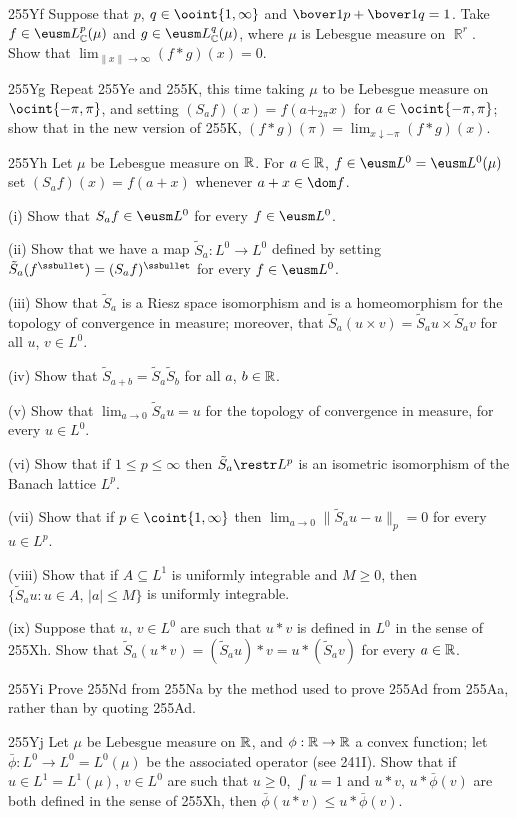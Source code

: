 {\spheader 255Yf Suppose that $p$, $q\in\ooint{1,\infty}$ and
$\bover1p+\bover1q=1$.   Take $f\in\eusm L^p_{\Bbb C}(\mu)$ and
$g\in\eusm L^q_{\Bbb C}(\mu)$, where $\mu$ is Lebesgue measure on
$\BbbR^r$.   Show that $\lim_{\|x\|\to\infty}(f*g)(x)=0$.

\spheader 255Yg Repeat 255Ye and 255K, this time taking $\mu$ to
be Lebesgue measure on $\ocint{-\pi,\pi}$, and setting
$(S_af)(x)=f(a+_{2\pi}x)$ for $a\in\ocint{-\pi,\pi}$;  show that in the
new version of 255K,
$(f*g)(\pi)=\lim_{x\downarrow -\pi}(f*g)(x)$.

\spheader 255Yh Let $\mu$ be Lebesgue measure on $\Bbb R$.   For
$a\in\Bbb R$, $f\in\eusm L^0=\eusm L^0(\mu)$ set $(S_af)(x)=f(a+x)$
whenever $a+x\in\dom f$.

\quad (i) Show that $S_af\in\eusm L^0$ for every $f\in\eusm L^0$.

\quad  (ii) Show that we have a map $\tilde S_a:L^0\to L^0$ defined by
setting $\tilde S_a(f^{\ssbullet})=(S_af)^{\ssbullet}$ for every
$f\in\eusm L^0$.

\quad  (iii) Show that $\tilde S_a$ is a Riesz space isomorphism and is
a homeomorphism for the topology of convergence in measure;  moreover,
that $\tilde S_a(u\times v)=\tilde S_au\times\tilde S_av$ for all $u$,
$v\in L^0$.

\quad  (iv) Show that $\tilde S_{a+b}=\tilde S_a\tilde S_b$ for all $a$,
$b\in\Bbb R$.

\quad  (v) Show that $\lim_{a\to 0}\tilde S_au=u$ for the topology of
convergence in measure, for every $u\in L^0$.

\quad  (vi) Show that if $1\le p\le\infty$ then $\tilde S_a\restr L^p$
is an isometric isomorphism of the Banach lattice $L^p$.

\quad  (vii) Show that if $p\in\coint{1,\infty}$ then
$\lim_{a\to 0}\|\tilde S_au-u\|_p=0$ for every $u\in L^p$.

\quad  (viii) Show that if $A\subseteq L^1$ is uniformly integrable and
$M\ge 0$, then $\{\tilde S_au:u\in A,\,|a|\le M\}$ is uniformly
integrable.

\quad (ix) Suppose that $u$, $v\in L^0$ are such that $u*v$ is defined
in $L^0$ in the sense of 255Xh.   Show that
$\tilde S_a(u*v)=(\tilde S_au)*v=u*(\tilde S_av)$ for
every $a\in\Bbb R$.

\spheader 255Yi Prove 255Nd from 255Na by the method used to
prove 255Ad from 255Aa, rather than by quoting 255Ad.

\spheader 255Yj Let $\mu$ be Lebesgue measure on $\Bbb R$, and
$\phi:\Bbb R\to\Bbb R$ a convex function;  let
$\bar\phi:L^0\to L^0=L^0(\mu)$ be the associated operator (see 241I).
Show that if $u\in L^1=L^1(\mu)$, $v\in L^0$ are such that $u\ge 0$,
$\int u=1$ and $u*v$, $u*\bar\phi(v)$ are both defined in the sense of
255Xh, then $\bar\phi(u*v)\le u*\bar\phi(v)$.

}
